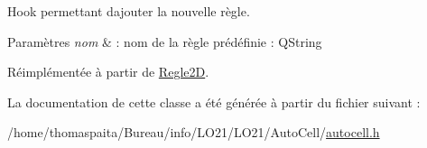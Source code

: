 Hook permettant d\textquotesingle{}ajouter la nouvelle règle. 


\begin{DoxyParams}{Paramètres}
{\em nom} & \+: nom de la règle prédéfinie \+: Q\+String \\
\hline
\end{DoxyParams}


Réimplémentée à partir de \hyperlink{class_regle2_d_ad53e81ccd6fa9eb94d30d87dca19a213}{Regle2D}.



La documentation de cette classe a été générée à partir du fichier suivant \+:\begin{DoxyCompactItemize}
\item 
/home/thomaspaita/\+Bureau/info/\+L\+O21/\+L\+O21/\+Auto\+Cell/\hyperlink{autocell_8h}{autocell.\+h}\end{DoxyCompactItemize}
